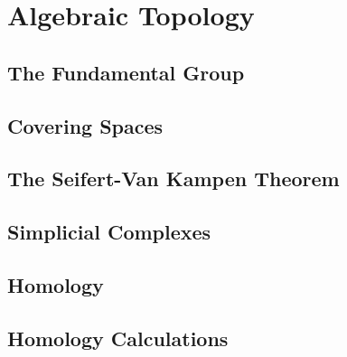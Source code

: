 \documentclass[main.tex]{subfiles}
\begin{document}
	\chapter{Algebraic Topology}
		\section{The Fundamental Group}
		
		\section{Covering Spaces}
		
		\section{The Seifert-Van Kampen Theorem}
		
		\section{Simplicial Complexes}
		
		\section{Homology}
		
		\section{Homology Calculations}
				
\end{document}

